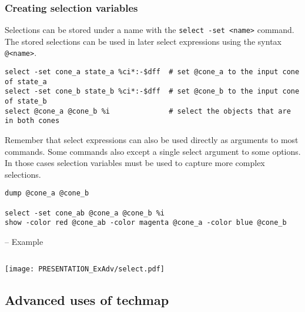 \subsubsection{Creating selection variables}

\begin{frame}[fragile]{\subsubsecname}
Selections can be stored under a name with the {\tt select -set <name>}
command. The stored selections can be used in later select expressions
using the syntax {\tt @<name>}.

\medskip
\begin{lstlisting}[xleftmargin=0.5cm, basicstyle=\ttfamily\fontsize{8pt}{10pt}\selectfont, language=ys]
select -set cone_a state_a %ci*:-$dff  # set @cone_a to the input cone of state_a
select -set cone_b state_b %ci*:-$dff  # set @cone_b to the input cone of state_b
select @cone_a @cone_b %i              # select the objects that are in both cones
\end{lstlisting}

\bigskip
Remember that select expressions can also be used directly as arguments to most
commands. Some commands also except a single select argument to some options.
In those cases selection variables must be used to capture more complex selections.

\medskip
\begin{lstlisting}[xleftmargin=0.5cm, basicstyle=\ttfamily\fontsize{8pt}{10pt}\selectfont, language=ys]
dump @cone_a @cone_b

select -set cone_ab @cone_a @cone_b %i
show -color red @cone_ab -color magenta @cone_a -color blue @cone_b
\end{lstlisting}
\end{frame}

\begin{frame}[fragile]{\subsubsecname{} -- Example}
\begin{columns}
\column[t]{4cm}

\column[t]{7cm}

\end{columns}
\hfil\texttt{[image: PRESENTATION\_ExAdv/select.pdf]}
\end{frame}


\subsection{Advanced uses of techmap}


